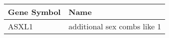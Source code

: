 \begin{tabular}{ll}
\toprule
Gene Symbol &                        Name \\
\midrule
      ASXL1 & additional sex combs like 1 \\
\bottomrule
\end{tabular}
